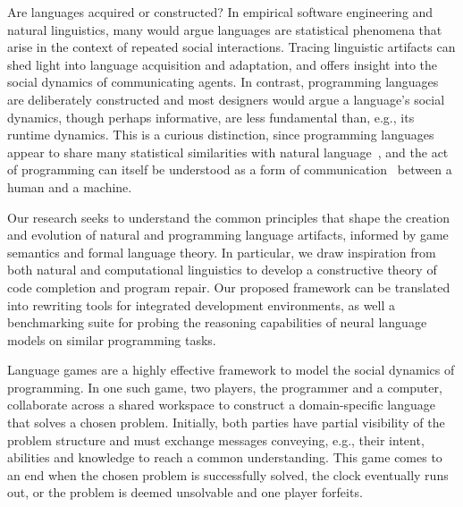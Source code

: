 \documentclass[sigplan,screen]{acmart}
\begin{document}

Are languages acquired or constructed? In empirical software engineering and natural linguistics, many would argue languages are statistical phenomena that arise in the context of repeated social interactions. Tracing linguistic artifacts can shed light into language acquisition and adaptation, and offers insight into the social dynamics of communicating agents. In contrast, programming languages are deliberately constructed and most designers would argue a language's social dynamics, though perhaps informative, are less fundamental than, e.g., its runtime dynamics. This is a curious distinction, since programming languages appear to share many statistical similarities with natural language~\cite{hindle2016naturalness}, and the act of programming can itself be understood as a form of communication~\cite{demillo1979social} between a human and a machine.

Our research seeks to understand the common principles that shape the creation and evolution of natural and programming language artifacts, informed by game semantics and formal language theory. In particular, we draw inspiration from both natural and computational linguistics to develop a constructive theory of code completion and program repair. Our proposed framework can be translated into rewriting tools for integrated development environments, as well a benchmarking suite for probing the reasoning capabilities of neural language models on similar programming tasks.

Language games are a highly effective framework to model the social dynamics of programming. In one such game, two players, the programmer and a computer, collaborate across a shared workspace to construct a domain-specific language that solves a chosen problem. Initially, both parties have partial visibility of the problem structure and must exchange messages conveying, e.g., their intent, abilities and knowledge to reach a common understanding. This game comes to an end when the chosen problem is successfully solved, the clock eventually runs out, or the problem is deemed unsolvable and one player forfeits.
\end{document}
